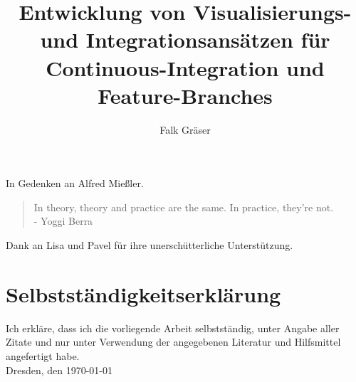 \documentclass[12pt,a4paper]{book}
\author{Falk Gräser}
\title{Entwicklung von Visualisierungs- und Integrationsansätzen für Continuous-Integration und Feature-Branches}
\begin{document}
\frontmatter

\maketitle

\cleardoublepage


\vfill
{\centering
In Gedenken an Alfred Mießler.
}
\vfill
\blockquote {In theory, theory and practice are the same. In practice, they’re not. \\- Yoggi Berra}
\vfill
{\centering
Dank an Lisa und Pavel für ihre unerschütterliche Unterstützung.
}

\tableofcontents
\listoffigures
\printglossary

\mainmatter








\appendix
\printbibliography[heading=bibnumbered]
\chapter{Selbstständigkeitserklärung}
Ich erkläre, dass ich die vorliegende Arbeit selbstständig, unter Angabe aller Zitate und nur unter Verwendung der angegebenen Literatur und Hilfsmittel angefertigt habe.
\vspace{5em}
\\
Dresden, den \today
\end{document}

